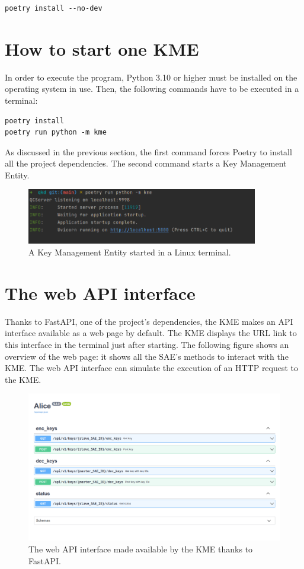 \begin{verbatim}
poetry install --no-dev
\end{verbatim}

\section{How to start one KME}
In order to execute the program, Python 3.10 or higher must be installed on the operating system in use. Then, the following commands have to be executed in a terminal:

\begin{verbatim}
poetry install
poetry run python -m kme
\end{verbatim}

As discussed in the previous section, the first command forces Poetry to install all the project dependencies. The second command starts a Key Management Entity.

\begin{figure}[H]
    \centering
    \includegraphics[width=0.9\textwidth]{Images/kme_start.png}
    \caption{A Key Management Entity started in a Linux terminal.}
    \label{fig:kme_start}
\end{figure}

\section{The web API interface}
\label{kme:api}

Thanks to FastAPI, one of the project's dependencies, the KME makes an API interface available as a web page by default. The KME displays the URL link to this interface in the terminal just after starting. The following figure shows an overview of the web page: it shows all the SAE's methods to interact with the KME. The web API interface can simulate the execution of an HTTP request to the KME.

\begin{figure}[H]
    \centering
    \includegraphics[width=1.0\textwidth]{Images/openapi.png}
    \caption{The web API interface made available by the KME thanks to FastAPI.}
    \label{fig:openapi}
\end{figure}

